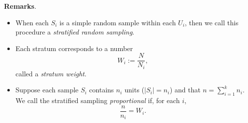 \documentclass[12pt]{article}
\begin{document}
\textbf{Remarks}.
\begin{itemize}
\item When each $S_i$ is a simple random sample within each $U_i$,
then we call this procedure a \emph{stratified random sampling}.
\item Each stratum corresponds to a number $$W_i:=\frac{N}{N_i},$$ called a
\emph{stratum weight}.
\item Suppose each sample $S_i$ contains $n_i$ units ($\lvert S_i
\rvert = n_i$) and that $n=\sum_{i=1}^{k}n_i$.  We call the
stratified sampling \emph{proportional} if, for each $i$,
$$\frac{n}{n_i}=W_i.$$
\end{itemize}
\end{document}
